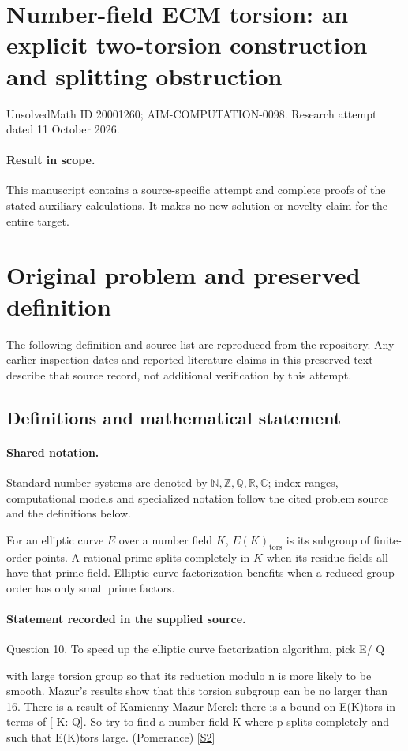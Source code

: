 \documentclass[11pt]{article}
\begin{document}
\section*{Number-field ECM torsion: an explicit two-torsion construction and splitting obstruction}
\noindent UnsolvedMath ID 20001260; AIM-COMPUTATION-0098. Research attempt dated 11 October 2026.
\paragraph{Result in scope.}This manuscript contains a source-specific attempt and complete proofs of the stated auxiliary calculations. It makes no new solution or novelty claim for the entire target.
\section{Original problem and preserved definition}
The following definition and source list are reproduced from the repository. Any earlier inspection dates and reported literature claims in this preserved text describe that source record, not additional verification by this attempt.
\subsection{Definitions and mathematical statement}

\paragraph{Shared notation.}Standard number systems are denoted by $\mathbb N,\mathbb Z,\mathbb Q,\mathbb R,\mathbb C$; index ranges, computational models and specialized notation follow the cited problem source and the definitions below.


For an elliptic curve $E$ over a number field $K$, $E(K)_{\mathrm{tors}}$ is its subgroup of finite-order points. A rational prime splits completely in $K$ when its residue fields all have that prime field. Elliptic-curve factorization benefits when a reduced group order has only small prime factors.
\paragraph{Statement recorded in the supplied source.}
Question 10. To speed up the elliptic curve factorization algorithm, pick E/ Q

with large torsion group so that its reduction modulo n is more likely to be smooth. Mazur's results show that this torsion subgroup can be no larger than 16. There is a result of Kamienny-Mazur-Merel: there is a bound on E(K)tors in terms of [ K: Q]. So try to find a number field K where p splits completely and such that E(K)tors large. (Pomerance) \href{https://aimath.org/WWN/primesinp/primesinp.pdf}{[S2]}
\end{document}
